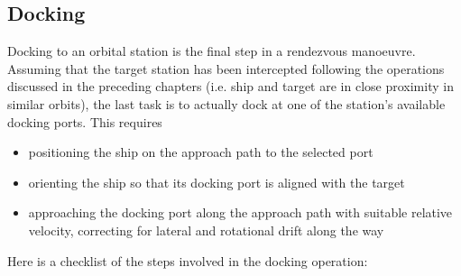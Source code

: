 \documentclass[Orbiter User Manual.tex]{subfiles}
\begin{document}
\subsection{Docking}
\label{ssec:basic_docking}
Docking to an orbital station is the final step in a rendezvous manoeuvre. Assuming that the target station has been intercepted following the operations discussed in the preceding chapters (i.e. ship and target are in close proximity in similar orbits), the last task is to actually dock at one of the station's available docking ports. This requires

\begin{itemize}
\item positioning the ship on the approach path to the selected port
\item orienting the ship so that its docking port is aligned with the target
\item approaching the docking port along the approach path with suitable relative velocity, correcting for lateral and rotational drift along the way
\end{itemize}

\noindent
Here is a checklist of the steps involved in the docking operation:
\end{document}
